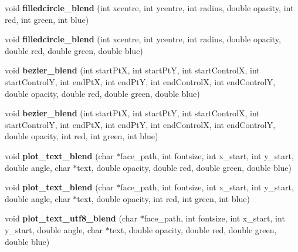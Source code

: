 \begin{DoxyCompactItemize}
\item 
\hypertarget{classpngwriter_ac4dce8fa2d79c8a38b3d943a572cb2ce}{}void {\bfseries filledcircle\+\_\+blend} (int xcentre, int ycentre, int radius, double opacity, int red, int green, int blue)\label{classpngwriter_ac4dce8fa2d79c8a38b3d943a572cb2ce}

\item 
\hypertarget{classpngwriter_a677aacc1b482c9e93f6e49652dc59a9c}{}void {\bfseries filledcircle\+\_\+blend} (int xcentre, int ycentre, int radius, double opacity, double red, double green, double blue)\label{classpngwriter_a677aacc1b482c9e93f6e49652dc59a9c}

\item 
\hypertarget{classpngwriter_a818dd221f714c04c16a05198aa94a416}{}void {\bfseries bezier\+\_\+blend} (int start\+Pt\+X, int start\+Pt\+Y, int start\+Control\+X, int start\+Control\+Y, int end\+Pt\+X, int end\+Pt\+Y, int end\+Control\+X, int end\+Control\+Y, double opacity, double red, double green, double blue)\label{classpngwriter_a818dd221f714c04c16a05198aa94a416}

\item 
\hypertarget{classpngwriter_a53c33752e803c97560fda9cdf7784b6d}{}void {\bfseries bezier\+\_\+blend} (int start\+Pt\+X, int start\+Pt\+Y, int start\+Control\+X, int start\+Control\+Y, int end\+Pt\+X, int end\+Pt\+Y, int end\+Control\+X, int end\+Control\+Y, double opacity, int red, int green, int blue)\label{classpngwriter_a53c33752e803c97560fda9cdf7784b6d}

\item 
\hypertarget{classpngwriter_af823a82b90f0c1989201325d74b37a4b}{}void {\bfseries plot\+\_\+text\+\_\+blend} (char $\ast$face\+\_\+path, int fontsize, int x\+\_\+start, int y\+\_\+start, double angle, char $\ast$text, double opacity, double red, double green, double blue)\label{classpngwriter_af823a82b90f0c1989201325d74b37a4b}

\item 
\hypertarget{classpngwriter_af648b8a2e133ff42938fe14ac65c4ffc}{}void {\bfseries plot\+\_\+text\+\_\+blend} (char $\ast$face\+\_\+path, int fontsize, int x\+\_\+start, int y\+\_\+start, double angle, char $\ast$text, double opacity, int red, int green, int blue)\label{classpngwriter_af648b8a2e133ff42938fe14ac65c4ffc}

\item 
\hypertarget{classpngwriter_a9755f82b419ac08910d0d46767ba1976}{}void {\bfseries plot\+\_\+text\+\_\+utf8\+\_\+blend} (char $\ast$face\+\_\+path, int fontsize, int x\+\_\+start, int y\+\_\+start, double angle, char $\ast$text, double opacity, double red, double green, double blue)\label{classpngwriter_a9755f82b419ac08910d0d46767ba1976}


\end{DoxyCompactItemize}
